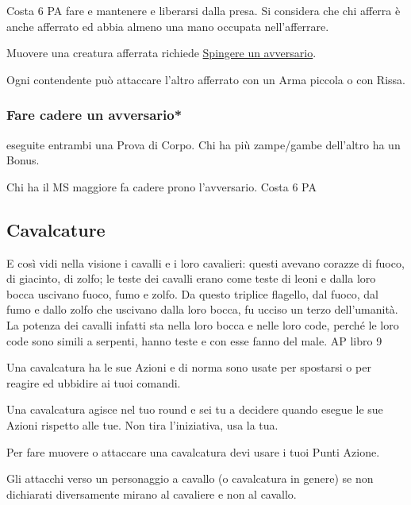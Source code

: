 \documentclass[12pt,a4paper,twoside,openany]{book}
\begin{document}
\begin{multicols}{2}
Costa 6 PA fare e mantenere e liberarsi dalla presa. Si considera che chi afferra è anche afferrato ed abbia almeno una mano occupata nell'afferrare.

Muovere una creatura afferrata richiede \hyperlink{spingereavversario}{Spingere un avversario}.

Ogni contendente può attaccare l'altro afferrato con un Arma piccola o con Rissa.

\subsubsection{Fare cadere un avversario*} \label{farecadereavversario}

eseguite entrambi una Prova di Corpo. Chi ha più zampe/gambe dell'altro ha un Bonus.

Chi ha il MS maggiore fa cadere prono l'avversario. Costa 6 PA

\subsection{Cavalcature}\label{cavalcature}

\begin{changemargin}{0.3cm}{0.3cm}\begin{enfasi}{
E così vidi nella visione i cavalli e i loro cavalieri: questi avevano corazze di fuoco, di giacinto, di zolfo; le teste dei cavalli erano come teste di leoni e dalla loro bocca uscivano fuoco, fumo e zolfo. Da questo triplice flagello, dal fuoco, dal fumo e dallo zolfo che uscivano dalla loro bocca, fu ucciso un terzo dell’umanità. La potenza dei cavalli infatti sta nella loro bocca e nelle loro code, perché le loro code sono simili a serpenti, hanno teste e con esse fanno del male. AP libro 9}\end{enfasi}\end{changemargin}\medskip

Una cavalcatura ha le sue Azioni e di norma sono usate per spostarsi o per reagire ed ubbidire ai tuoi comandi.

Una cavalcatura agisce nel tuo round e sei tu a decidere quando esegue le sue Azioni rispetto alle tue. Non tira l'iniziativa, usa la tua.

Per fare muovere o attaccare una cavalcatura devi usare i tuoi Punti Azione.

Gli attacchi verso un personaggio a cavallo (o cavalcatura in genere) se non dichiarati diversamente mirano al cavaliere e non al cavallo.


\end{multicols}
\end{document}
